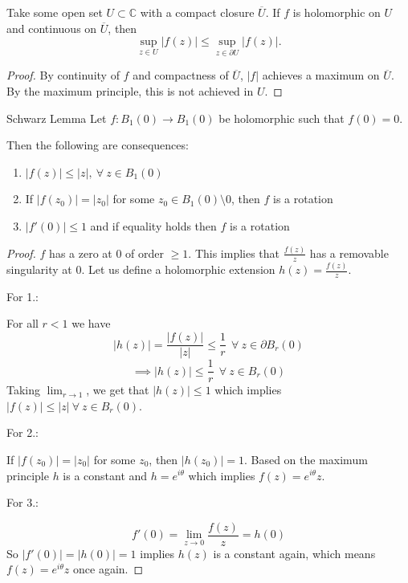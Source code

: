 \documentclass{article}
\begin{document}
\begin{cor}{}{}
Take some open set \( U \subset \mathbb{C}  \) with a compact closure \( \overline{U}  \). If \( f \) is holomorphic on \( U \) and continuous on \( \overline{U}  \), then 
\[
    \sup _{z \in U} |f(z)| \leq \sup _{z \in \partial U}|f(z)|.
\]

\tcbline
\begin{proof}
By continuity of \( f \) and compactness of \( \overline{U}  \), \( |f| \) achieves a maximum on \( \overline{U}  \). By the maximum principle, this is not achieved in \( U \). 
\end{proof}

\end{cor}

\begin{lem}{Schwarz Lemma}{}
Let \( f: B_1(0) \to  B_1(0)\) be holomorphic such that \( f(0) = 0 \). 

Then the following are consequences:
\begin{enumerate}[]
    \item \( |f(z)| \leq |z|, \ \forall \ z \in B_1(0) \) 
    \item If \( |f(z_0)| = |z_0| \) for some \( z_0 \in B_1(0) \setminus  0\), then \( f \) is a rotation
    \item \( |f'(0)|\leq 1 \)  and if equality holds then \( f \) is a rotation
\end{enumerate}
\tcbline

\begin{proof}
\( f \) has a zero at 0 of order \( \geq 1 \). This implies that \( \frac{f(z)}{z} \) has a removable singularity at \( 0 \). Let us define a holomorphic extension \( h(z) = \frac{f(z)}{z}   \). 

For 1.:

For all \( r<1 \) we have 
\[ |h(z)| = \frac{|f(z)|}{|z|} \leq \frac{1}{r} \ \  \forall \ z \in \partial B_{r} (0)  \]
\[
    \implies |h(z)| \leq \frac{1}{r}\ \  \forall \ z \in  B_{r} (0)
\]
Taking \( \lim_{r \to 1}  \), we get that \( |h(z)| \leq 1 \) which implies \( |f(z)| \leq |z| \  \forall \ z \in  B_{r} (0)\).

For 2.: 

If \( |f(z_0)|  = |z_0|\) for some \( z_0 \), then \( |h(z _0)| = 1 \). Based on the maximum principle \( h \) is a constant and \( h = e^{i \theta } \) which implies \( f(z) = e^{i \theta }z \). 

For 3.:

\[
    f'(0) = \lim_{z \to 0} \frac{f(z)}{z} = h(0)
\]
So \( |f'(0)| = |h(0)| = 1 \) implies \( h(z) \) is a constant again, which means \( f(z) =e^{i \theta }z   \) once again. 
\end{proof}

\end{lem}
\end{document}
